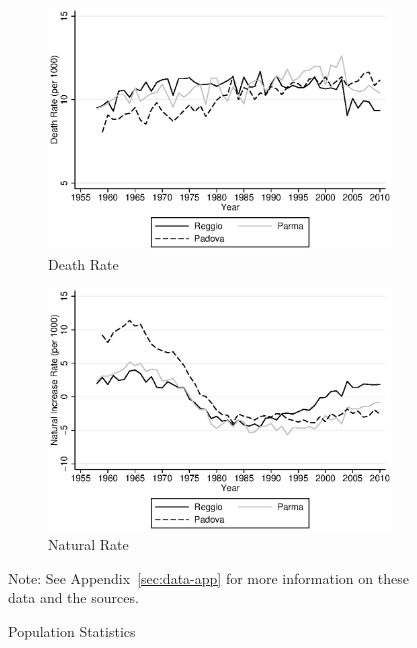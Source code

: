 \begin{figure}[H]
\begin{center}
\begin{subfigure}[t]{0.49\textwidth}
          \includegraphics[width=\textwidth]{../../output/image/death_rate.eps}
        \caption{Death Rate}
        \end{subfigure}
        \begin{subfigure}[t]{0.49\textwidth}
          \includegraphics[width=\textwidth]{../../output/image/naturalinc_rate.eps}
            \caption{Natural Rate}
        \end{subfigure}
      \caption{Population Statistics}  \label{fig:population}
      \end{center}
      \raggedright Note: See Appendix~\ref{sec:data-app} for more information on these data and the sources.
    \end{figure}

